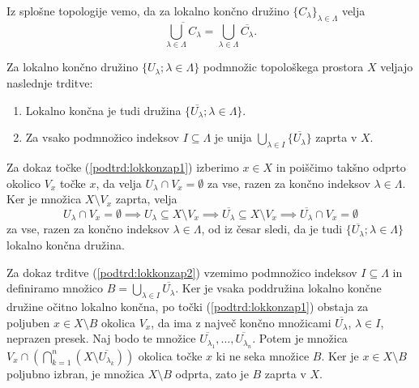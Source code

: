 \documentclass[mat1]{fmfdelo}
\newcommand{\closure}[1]{\overline{#1}}
\begin{document}
\begin{opomba}\label{opo:lokkon} %
Iz splošne topologije vemo, da za lokalno končno družino $\lbrace C_\lambda \rbrace_{\lambda \in \Lambda}$ velja
\[ \closure{\bigcup_{\lambda \in \Lambda} C_\lambda} = \bigcup_{\lambda \in \Lambda} \closure{C_\lambda}. \]
\end{opomba}

\begin{trditev}\label{trd:lokkonzap}
Za lokalno končno družino $\lbrace U_\lambda ; \lambda \in \Lambda \rbrace$ podmnožic topološkega prostora $X$ veljajo naslednje trditve:
\begin{enumerate} 
\item Lokalno končna je tudi družina $\lbrace \closure{U_\lambda} ; \lambda \in \Lambda \rbrace$.\label{podtrd:lokkonzap1}
\item Za vsako podmnožico indeksov $I \subseteq \Lambda$ je unija $\bigcup_{\lambda \in I}\lbrace \closure{U_\lambda}\rbrace$ zaprta v $X$.\label{podtrd:lokkonzap2}
\end{enumerate}
\end{trditev}

\begin{dokaz}
Za dokaz točke (\ref{podtrd:lokkonzap1}) izberimo $x \in X$ in poiščimo takšno odprto okolico $V_x$ točke $x$, da velja $U_\lambda \cap V_x = \emptyset$ za vse, razen za končno indeksov $\lambda \in \Lambda$. Ker je množica $X \setminus V_x$ zaprta, velja
\[ U_\lambda \cap V_x = \emptyset \implies U_\lambda \subseteq X \setminus V_x \implies \closure{U_\lambda} \subseteq X \setminus V_x \implies \closure{U_\lambda} \cap V_x = \emptyset \]
za vse, razen za končno indeksov $\lambda \in \Lambda$, od iz česar sledi, da je tudi $\lbrace \closure{U_\lambda} ; \lambda \in \Lambda \rbrace$ lokalno končna družina.

Za dokaz trditve (\ref{podtrd:lokkonzap2}) vzemimo podmnožico indeksov $I \subseteq \Lambda$ in definiramo množico $B = \bigcup_{\lambda \in I}\closure{U_\lambda}$. Ker je vsaka poddružina lokalno končne družine očitno lokalno končna, po točki (\ref{podtrd:lokkonzap1}) obstaja za poljuben $x \in X \setminus B$ okolica $V_x$, da ima z največ končno množicami $\closure{U_\lambda}$, $\lambda \in I$, neprazen presek. Naj bodo te množice $\closure{U_{\lambda_1}},\dots,\closure{U_{\lambda_n}}$. Potem je množica $V_x \cap (\bigcap_{k=1}^n(X \setminus \closure{U_{\lambda_k}}))$ okolica točke $x$ ki ne seka množice $B$. Ker je $x \in X \setminus B$ poljubno izbran, je množica $X \setminus B$ odprta, zato je $B$ zaprta v $X$.
\end{dokaz}
\end{document}
